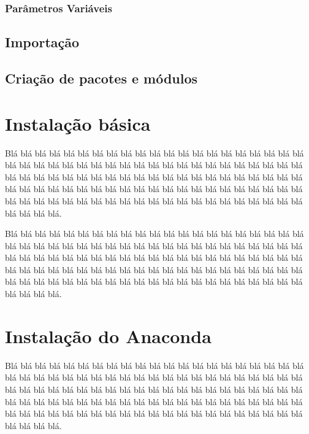 \documentclass[
]{book}
\begin{document}
\hypertarget{modul-funcao-var}{%
\subsection{Parâmetros Variáveis}\label{modul-funcao-var}}

\hypertarget{modul-import}{%
\section{Importação}\label{modul-import}}

\hypertarget{modul-packa}{%
\section{Criação de pacotes e módulos}\label{modul-packa}}

\hypertarget{appendix-apuxeandices}{%
\appendix}


\hypertarget{instalauxe7uxe3o-buxe1sica}{%
\chapter{Instalação básica}\label{instalauxe7uxe3o-buxe1sica}}

Blá blá blá blá blá blá blá blá blá blá blá blá blá blá blá blá blá blá blá blá blá blá blá blá blá blá blá blá blá blá blá blá blá blá blá blá blá blá blá blá blá blá blá blá blá blá blá blá blá blá blá blá blá blá blá blá blá blá blá blá blá blá blá blá blá blá blá blá blá blá blá blá blá blá blá blá blá blá blá blá blá blá blá blá blá blá blá blá blá blá blá blá blá blá blá blá blá blá blá blá blá blá blá blá blá blá blá blá blá.

Blá blá blá blá blá blá blá blá blá blá blá blá blá blá blá blá blá blá blá blá blá blá blá blá blá blá blá blá blá blá blá blá blá blá blá blá blá blá blá blá blá blá blá blá blá blá blá blá blá blá blá blá blá blá blá blá blá blá blá blá blá blá blá blá blá blá blá blá blá blá blá blá blá blá blá blá blá blá blá blá blá blá blá blá blá blá blá blá blá blá blá blá blá blá blá blá blá blá blá blá blá blá blá blá blá blá blá blá blá.

\hypertarget{instalauxe7uxe3o-do-anaconda}{%
\chapter{Instalação do Anaconda}\label{instalauxe7uxe3o-do-anaconda}}

Blá blá blá blá blá blá blá blá blá blá blá blá blá blá blá blá blá blá blá blá blá blá blá blá blá blá blá blá blá blá blá blá blá blá blá blá blá blá blá blá blá blá blá blá blá blá blá blá blá blá blá blá blá blá blá blá blá blá blá blá blá blá blá blá blá blá blá blá blá blá blá blá blá blá blá blá blá blá blá blá blá blá blá blá blá blá blá blá blá blá blá blá blá blá blá blá blá blá blá blá blá blá blá blá blá blá blá blá blá.
\end{document}
